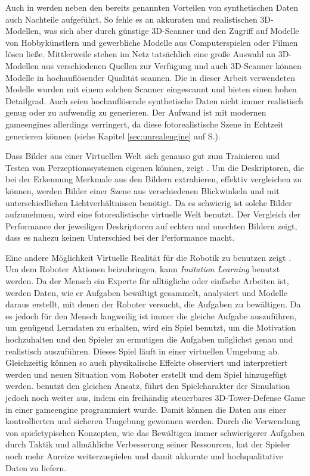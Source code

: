 Auch in \cite{heisele} werden neben den bereits genannten Vorteilen von synthetischen Daten auch Nachteile aufgeführt. So fehle es an akkuraten und realistischen 3D-Modellen, was sich aber durch günstige 3D-Scanner und den Zugriff auf Modelle von Hobbykünstlern und gewerbliche Modelle aus Computerspielen oder Filmen lösen ließe. Mittlerweile stehen im Netz tatsächlich eine große Auswahl an 3D-Modellen aus verschiedenen Quellen zur Verfügung und auch 3D-Scanner können Modelle in hochauflösender Qualität scannen. Die in dieser Arbeit verwendeten Modelle wurden mit einem solchen Scanner eingescannt und bieten einen hohen Detailgrad. \newline
Auch seien hochauflösende synthetische Daten nicht immer realistisch genug oder zu aufwendig zu generieren. Der Aufwand ist mit modernen \glspl{gameengine} allerdings verringert, da diese fotorealistische Szene in Echtzeit generieren können (siehe Kapitel \ref{sec:unrealengine} auf S.\pageref{sec:unrealengine}).  \par

Dass Bilder aus einer Virtuellen Welt sich genauso gut zum Trainieren und Testen von Perzeptionssystemen eigenen können, zeigt \cite{kaneva}. Um die Deskriptoren, die bei der Erkennung Merkmale aus den Bildern extrahieren, effektiv vergleichen zu können, werden Bilder einer Szene aus verschiedenen Blickwinkeln und mit unterschiedlichen Lichtverhältnissen benötigt. Da es schwierig ist solche Bilder aufzunehmen, wird eine fotorealistische virtuelle Welt benutzt. Der Vergleich der Performance der jeweiligen Deskriptoren auf echten und unechten Bildern zeigt, dass es nahezu keinen Unterschied bei der Performance macht. \par 

Eine andere Möglichkeit Virtuelle Realität für die Robotik zu benutzen zeigt \cite{imitationLearning2}. Um dem Roboter Aktionen beizubringen, kann \textit{Imitation Learning} benutzt werden. Da der Mensch ein Experte für alltägliche oder einfache Arbeiten ist, werden Daten, wie er Aufgaben bewältigt gesammelt, analysiert und Modelle daraus erstellt, mit denen der Roboter versucht, die Aufgaben zu bewältigen. Da es jedoch für den Mensch langweilig ist immer die gleiche Aufgabe auszuführen, um genügend Lerndaten zu erhalten, wird ein Spiel benutzt, um die Motivation hochzuhalten und den Spieler zu ermutigen die Aufgaben möglichst genau und realistisch auszuführen. Dieses Spiel läuft in einer virtuellen Umgebung ab. Gleichzeitig können so auch physikalische Effekte observiert und interpretiert werden und neuen Situation vom Roboter erstellt und dem Spiel hinzugefügt werden. \newline
\cite{imitationLearning1} benutzt den gleichen Ansatz, führt den Spielcharakter der Simulation jedoch noch weiter aus, indem ein freihändig steuerbares 3D-Tower-Defense Game in einer \gls{gameengine} programmiert wurde. Damit können die Daten aus einer kontrollierten und sicheren Umgebung gewonnen werden. Durch die Verwendung von spieletypischen Konzepten, wie das Bewältigen immer schwierigerer Aufgaben durch Taktik und allmähliche Verbesserung seiner Ressourcen, hat der Spieler noch mehr Anreize weiterzuspielen und damit akkurate und hochqualitative Daten zu liefern. 


